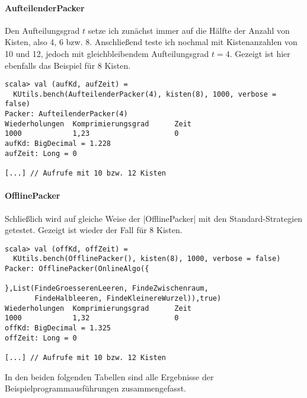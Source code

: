 \paragraph{AufteilenderPacker}
Den Aufteilungsgrad $t$ setze ich zunächst immer auf die Hälfte der Anzahl von Kisten, also 4, 6 bzw. 8.
Anschließend teste ich nochmal mit Kistenanzahlen von 10 und 12, jedoch mit gleichbleibendem Aufteilungsgrad $t = 4$.
Gezeigt ist hier ebenfalls das Beispiel für 8 Kisten.
\begin{lstlisting}
scala> val (aufKd, aufZeit) =
  KUtils.bench(AufteilenderPacker(4), kisten(8), 1000, verbose = false)
Packer: AufteilenderPacker(4)
Wiederholungen  Komprimierungsgrad      Zeit
1000            1,23                    0
aufKd: BigDecimal = 1.228
aufZeit: Long = 0

[...] // Aufrufe mit 10 bzw. 12 Kisten
\end{lstlisting}

\paragraph{OfflinePacker}
Schließlich wird auf gleiche Weise der |OfflinePacker| mit den Standard-Strategien getestet. Gezeigt ist wieder der Fall für 8 Kisten.
\begin{lstlisting}
scala> val (offKd, offZeit) =
  KUtils.bench(OfflinePacker(), kisten(8), 1000, verbose = false)
Packer: OfflinePacker(OnlineAlgo({

},List(FindeGroesserenLeeren, FindeZwischenraum,
       FindeHalbleeren, FindeKleinereWurzel)),true)
Wiederholungen  Komprimierungsgrad      Zeit
1000            1,32                    0
offKd: BigDecimal = 1.325
offZeit: Long = 0

[...] // Aufrufe mit 10 bzw. 12 Kisten
\end{lstlisting}
\clearpage
In den beiden folgenden Tabellen sind alle Ergebnisse der Beispielprogrammausführungen zusammengefasst.
